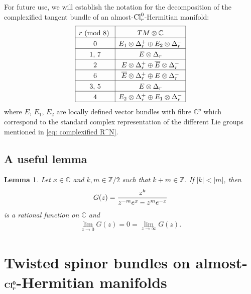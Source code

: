 \documentclass[pdftex]{sigma}
\newcommand\tstrut{\rule{0pt}{2.6ex}}
\numberwithin{equation}{section}
\newtheorem{Lemma}[Theorem]{Lemma}
 { \theoremstyle{definition}
\newtheorem{Definition}[Theorem]{Definition}
\newtheorem{Example}[Theorem]{Example}
\newtheorem{Remark}[Theorem]{Remark} }
\begin{document}
For future use, we will establish the notation for the decomposition of the complexif\/ied tangent bundle of an almost-${\rm Cl}_r^0$-Hermitian manifold:
\begin{gather}
\begin{array}{|c|c|}
 \hline
 r \mbox{\ {\rm (mod 8)} } &TM\otimes \mathbb{C}
\rule{0pt}{3ex}\\
\hline
 0 & E_1\otimes \Delta_r^+ \oplus E_2\otimes \Delta_r^-\tstrut\\
 \hline
 1,\, 7 & E\otimes \Delta_r\tstrut\\
\hline
 2 & E\otimes \Delta_r^+\oplus\overline{E}\otimes\Delta_r^-\tstrut\\
\hline
 6 & \overline{E}\otimes \Delta_r^+\oplus E\otimes\Delta_r^-\tstrut\\
\hline
 3,\, 5 & E\otimes \Delta_r\tstrut\\
\hline
 4 & E_2\otimes \Delta_r^+ \oplus E_1\otimes \Delta_r^-\tstrut\\
\hline
 \end{array} \label{eq: complexified tangent space}
\end{gather}
where $E$, $E_1$, $E_2$ are locally def\/ined vector bundles with f\/ibre $\mathbb{C}^p$ which correspond to the standard complex representation
of the dif\/ferent Lie groups mentioned in %
\eqref{eq: complexified R^N}.

\subsection{A useful lemma}

\begin{Lemma}\label{lemma: useful lemma}
Let $x\in \mathbb{C}$ and $k,m\in \mathbb{Z}/2$ such that $k+m\in \mathbb{Z}$. If $|k|<|m|$, then
\begin{gather*}G(z)={z^{k}\over z^{-m}e^{x} - z^{m}e^{-x}}\end{gather*}
 is a rational function on $\mathbb{C}$ and
\begin{gather*}\lim_{z\rightarrow 0 } G(z) = 0 = \lim_{z\rightarrow \infty } G(z).\end{gather*}
\end{Lemma}

\section[Twisted spinor bundles on almost-${\rm Cl}_r^0$-Hermitian manifolds]{Twisted spinor bundles on almost-$\boldsymbol{{\rm Cl}_r^0}$-Hermitian manifolds}\label{sec: twisted spinor bundles}
\end{document}
